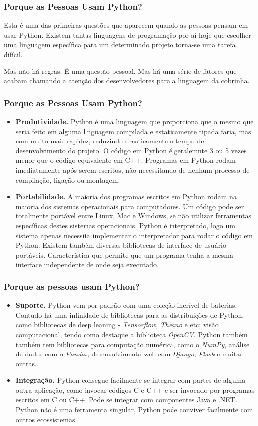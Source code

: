 \documentclass[aspectratio=169]{beamer}
\begin{document}
\begin{frame}
    \frametitle{Porque as Pessoas Usam Python?}
    Esta é uma das primeiras questões que aparecem quando as pessoas pensam em
usar Python. Existem tantas linguagens de programação por aí hoje que escolher uma
linguagem específica para um determinado projeto torna-se uma tarefa difícil.

    Mas não há regras. É uma questão pessoal. Mas há uma série de fatores que
acabam chamando a atenção dos desenvolvedores para a linguagem da cobrinha.
\end{frame}

\begin{frame}
    \frametitle{Porque as Pessoas Usam Python?}
    \begin{itemize}
        \item \textbf{Produtividade.} Python é uma linguagem que proporciona que o
mesmo que seria feito em alguma linguagem compilada e estaticamente tipada faria, mas com
muito mais rapidez, reduzindo drasticamente o tempo de desenvolvimento do projeto. O
código em Python é geralemnte 3 ou 5 vezes menor que o código equivalente em C++. Programas
em Python rodam imediatamente após serem escritos, não necessitando de nenhum processo de
compilação, ligação ou montagem.
        \item \textbf{Portabilidade.} A maioria dos programas escritos em Python rodam
na maioria dos sistemas operacionais para computadores. Um código pode ser totalmente
portável entre Linux, Mac e Windows, se não utilizar ferramentas específicas destes
sistemas operacionais. Python é interpretado, logo um sistema apenas necessita implementar
o interpretador para rodar o código em Python. Existem
também diversas bibliotecas de interface de usuário portáveis. Característica que permite que
um programa tenha a mesma interface independente de onde seja executado.
    \end{itemize}
\end{frame}

\begin{frame}
    \frametitle{Porque as pessoas usam Python?}
    \begin{itemize}
        \item \textbf{Suporte.} Python vem por padrão com uma coleção incrível de baterias.
Contudo há uma infinidade de bibliotecas para as distribuições de Python, como bibliotecas
de deep leaning - \textit{Tensorflow}, \textit{Theano} e etc; visão computacional,
tendo como destaque a biblioteca \textit{OpenCV}. Python também também tem bibliotecas para
computação numérica, como o \textit{NumPy}, análise de dados com o \textit{Pandas},
desenvolvimento web com \textit{Django}, \textit{Flask} e muitas outras.
        \item \textbf{Integração.} Python consegue facilmente se integrar com partes
de alguma outra aplicação, como invocar códigos C e C++ e ser invocado por programas escritos
em C ou C++. Pode se integrar com componentes Java e .NET. Python não é uma ferramenta
singular, Python pode conviver facilmente com outros ecossistemas.
    \end{itemize}
\end{frame}
\end{document}
